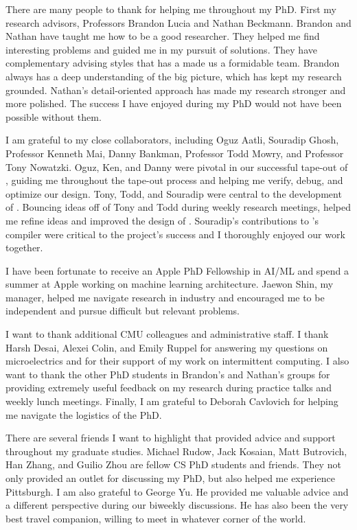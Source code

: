 \begin{acknowledgements}
\addchaptertocentry{\acknowledgementname} %
There are many people to thank for helping me throughout my PhD.
% 
First my research advisors, Professors Brandon Lucia and Nathan Beckmann.
% 
Brandon and Nathan have taught me how to be a good researcher.
% 
They helped me find interesting problems and guided me in my pursuit of solutions.
% 
They have complementary advising styles that has a made us a formidable team.
% 
Brandon always has a deep understanding of the big picture, which has kept my research grounded.
% 
Nathan's detail-oriented approach has made my research stronger and more polished.
% 
The success I have enjoyed during my PhD would not have been possible without them.

I am grateful to my close collaborators, including Oguz Aatli, Souradip Ghosh, Professor Kenneth Mai, Danny Bankman, Professor Todd Mowry, and Professor Tony Nowatzki.
%
Oguz, Ken, and Danny were pivotal in our successful tape-out of \manic, guiding me throughout the tape-out process and helping me verify, debug, and optimize our design.
% 
Tony, Todd, and Souradip were central to the development of \riptide.
% 
Bouncing ideas off of Tony and Todd during weekly research meetings, helped me refine ideas and improved the design of \riptide.
% 
Souradip's contributions to \riptide's compiler were critical to the project's success and I thoroughly enjoyed our work together.

I have been fortunate to receive an Apple PhD Fellowship in AI/ML and spend a summer at Apple working on machine learning architecture.
% 
Jaewon Shin, my manager, helped me navigate research in industry and encouraged me to be independent and pursue difficult but relevant problems.

I want to thank additional CMU colleagues and administrative staff.
% 
I thank Harsh Desai, Alexei Colin, and Emily Ruppel for answering my questions on microelectrics and for their support of my work on intermittent computing.
% 
I also want to thank the other PhD students in Brandon's and Nathan's groups for providing extremely useful feedback on my research during practice talks and weekly lunch meetings.
% 
Finally, I am grateful to Deborah Cavlovich for helping me navigate the logistics of the PhD.

There are several friends I want to highlight that provided advice and support throughout my graduate studies.
% 
Michael Rudow, Jack Kosaian, Matt Butrovich, Han Zhang, and Guilio Zhou are fellow CS PhD students and friends. 
% 
They not only provided an outlet for discussing my PhD, but also helped me experience Pittsburgh.
% 
I am also grateful to George Yu.
% 
He provided me valuable advice and a different perspective during our biweekly discussions.
% 
He has also been the very best travel companion, willing to meet in whatever corner of the world.


\end{acknowledgements}
